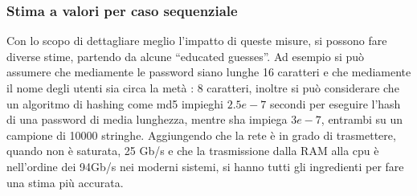 \subsubsection{Stima a valori per caso sequenziale}
 Con lo scopo di dettagliare meglio l'impatto di queste misure, si possono fare diverse stime, partendo da alcune ``educated guesses''. Ad esempio si può assumere che mediamente le password siano lunghe 16 caratteri e che mediamente il nome degli utenti sia circa la metà : 8 caratteri, inoltre si può considerare che un algoritmo di hashing come md5 impieghi $2.5e-7$ secondi per eseguire l'hash di una password di media lunghezza, mentre sha impiega $3e-7$, entrambi su un campione di 10000 stringhe. Aggiungendo che la rete è in grado di trasmettere, quando non è saturata, 25 Gb/s e che la trasmissione dalla RAM alla cpu è nell'ordine dei 94Gb/s nei moderni sistemi,  si hanno tutti gli ingredienti per fare una stima più accurata.  
